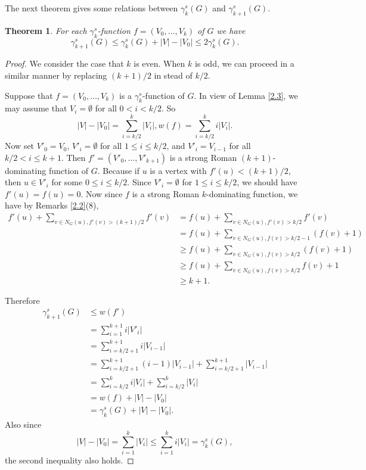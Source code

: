 \documentclass[12pt]{amsart}
\newtheorem{theorem}{Theorem}[section]
\begin{document}
The next theorem gives some relations between $\gamma_k^s(G)$ and $\gamma_{k+1}^s(G)$.
\begin{theorem}\label{2.4}
For each $\gamma_k^s$-function $f=(V_0, \dots , V_k)$ of $G$ we have 
$$\gamma_{k+1}^s(G)\leq \gamma_k^s(G)+|V|-|V_0|\leq 2\gamma_k^s(G).$$
\end{theorem}
\begin{proof}
We consider the case that $k$ is even. When $k$ is odd, we can proceed in a similar manner by replacing $(k+1)/2$ in stead of $k/2$.

Suppose that $f=(V_0, \dots , V_k)$ is a $\gamma _k^s$-function of $G$. In view of Lemma \ref{2.3}, we may assume that $V_i=\emptyset$ for all $0< i <k/2$. So
 $$|V|-|V_0|=\sum_{i=k/2}^k |V_i|, w(f)=\sum_{i=k/2}^ki|V_i|.$$
  Now set $V'_0=V_0$, $V'_i=\emptyset$ for all $1\leq i \leq k/2$, and $V'_i=V_{i-1}$ for all $k/2<i\leq k+1$. Then $f'=(V'_0, \dots , V'_{k+1})$ is a strong Roman $(k+1)$-dominating function of $G$. Because if $u$ is a vertex with $f'(u)<(k+1)/2$, then $u\in V'_i$ for some $0\leq i \leq k/2$. Since $V'_i=\emptyset$ for $1\leq i\leq k/2$, we should have $f'(u)=f(u)=0$. Now since $f$ is a strong Roman $k$-dominating function, we have by Remarks \ref{2.2}(8),
 \begin{align*}
 f'(u)+\sum_{v\in N_G(u), f'(v)>(k+1)/2}f'(v)&=f(u)+\sum_{v\in N_G(u), f'(v)>k/2}f'(v)\\
 &=f(u)+\sum_{v\in N_G(u), f(v)>k/2-1}(f(v)+1)\\
 &\geq f(u)+\sum_{v\in N_G(u), f(v)>k/2}(f(v)+1)\\
 &\geq f(u)+\sum_{v\in N_G(u), f(v)>k/2}f(v)+1\\
 &\geq k+1.
 \end{align*}
 
  Therefore
\begin{align*}
\gamma_{k+1}^s(G)&\leq w(f')\\
&=\sum_{i=1}^{k+1}i|V'_i|\\
&=\sum_{i=k/2+1}^{k+1}i|V_{i-1}|\\
&=\sum_{i=k/2+1}^{k+1}(i-1)|V_{i-1}|+\sum_{i=k/2+1}^{k+1}|V_{i-1}|\\
&=\sum_{i=k/2}^{k}i|V_i|+\sum_{i=k/2}^{k}|V_i|\\
&=w(f)+|V|-|V_0|\\
&=\gamma _k^s(G)+|V|-|V_0|.
\end{align*} 
Also since 
$$|V|-|V_0|=\sum_{i=1}^k|V_i| \leq \sum_{i=1}^ki|V_i|=\gamma_k^s(G),$$
the second inequality also holds.
\end{proof}
\end{document}

